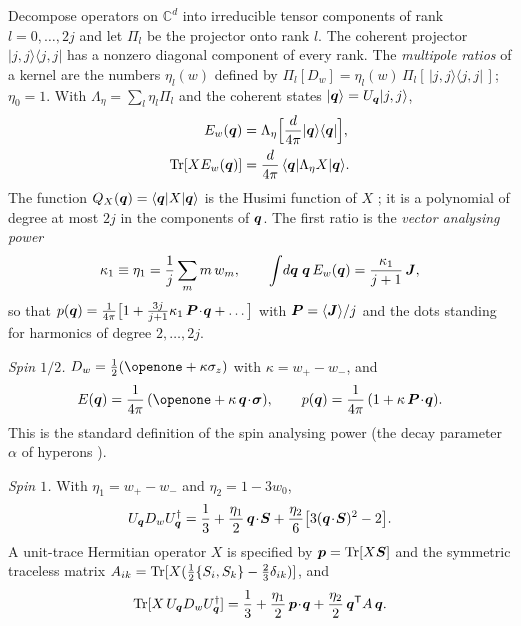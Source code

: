 Decompose operators on $\mathbb{C}^d$ into irreducible tensor components of rank $l=0,\dots,2j$ and let $\Pi_l$ be the projector onto rank $l$. The coherent projector $|j,j\rangle\langle j,j|$ has a nonzero diagonal component of every rank. The \emph{multipole ratios} of a kernel are the numbers $\eta_l(w)$ defined by $\Pi_l[D_w]=\eta_l(w)\,\Pi_l[\,|j,j\rangle\langle j,j|\,]$; $\eta_0=1$. With $\Lambda_\eta=\sum_l\eta_l\Pi_l$ and the coherent states $|\bm{q}\rangle=U_{\bm{q}}|j,j\rangle$,
\begin{equation}
\begin{aligned}
E_w(\bm{q})&=\Lambda_\eta\Big[\frac{d}{4\pi}|\bm{q}\rangle\langle\bm{q}|\Big],\\
\operatorname{Tr}[XE_w(\bm{q})]&=\frac{d}{4\pi}\,\langle\bm{q}|\Lambda_\eta X|\bm{q}\rangle .
\end{aligned}
\label{eq:lambda}
\end{equation}
The function $Q_X(\bm{q})=\langle\bm{q}|X|\bm{q}\rangle$ is the Husimi function of $X$ \cite{radcliffe1971}; it is a polynomial of degree at most $2j$ in the components of $\bm{q}$. The first ratio is the \emph{vector analysing power}
\begin{equation}
\kappa_1\equiv\eta_1=\frac1j\sum_mm\,w_m,\qquad \int\! d\bm{q}\;\bm{q}\,E_w(\bm{q})=\frac{\kappa_1}{j+1}\,\bm{J} ,
\label{eq:firstmoment}
\end{equation}
so that $p(\bm{q})=\frac{1}{4\pi}\big[1+\frac{3j}{j+1}\kappa_1\,\bm{P}\!\cdot\!\bm{q}+\dots\big]$ with $\bm{P}=\langle\bm{J}\rangle/j$ and the dots standing for harmonics of degree $2,\dots,2j$.

\emph{Spin $1/2$.} $D_w=\tfrac12(\openone+\kappa\sigma_z)$ with $\kappa=w_+-w_-$, and
\begin{equation}
E(\bq)=\frac{1}{4\pi}\,(\openone+\kappa\,\bq\!\cdot\!\bsig),\qquad p(\bq)=\frac{1}{4\pi}\,(1+\kappa\,\bP\!\cdot\!\bq).
\label{eq:half}
\end{equation}
This is the standard definition of the spin analysing power (the decay parameter $\alpha$ of hyperons \cite{leeyang1957}).

\emph{Spin $1$.} With $\eta_1=w_+-w_-$ and $\eta_2=1-3w_0$,
\begin{equation}
U_{\bm{q}}D_wU_{\bm{q}}^\dagger=\frac13+\frac{\eta_1}{2}\,\bm{q}\!\cdot\!\bm{S}+\frac{\eta_2}{6}\big[3(\bm{q}\!\cdot\!\bm{S})^2-2\big].
\label{eq:spin1kernel}
\end{equation}
A unit-trace Hermitian operator $X$ is specified by $\bm{p}=\operatorname{Tr}[X\bm{S}]$ and the symmetric traceless matrix $A_{ik}=\operatorname{Tr}[X(\tfrac12\{S_i,S_k\}-\tfrac23\delta_{ik})]$, and
\begin{equation}
\operatorname{Tr}[X\,U_{\bm{q}}D_wU_{\bm{q}}^\dagger]=\frac13+\frac{\eta_1}{2}\,\bm{p}\!\cdot\!\bm{q}+\frac{\eta_2}{2}\,\bm{q}^{\mathsf{T}}A\,\bm{q} .
\label{eq:symbol}
\end{equation}


